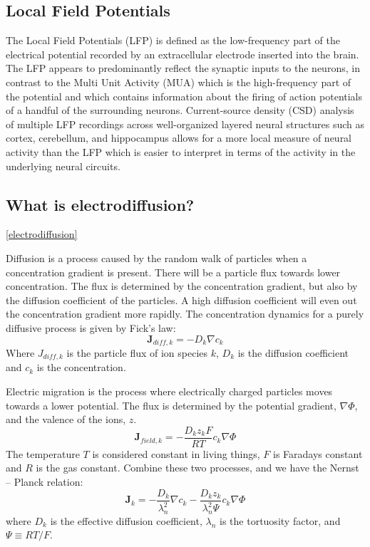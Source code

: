 \documentclass{article}
\begin{document}
\subsection{Local Field Potentials}
The Local Field Potentials (LFP) is defined as the low-frequency part of the electrical potential recorded by an extracellular electrode
inserted into the brain. The LFP appears to predominantly reflect the synaptic inputs to the neurons, in contrast to the Multi Unit Activity (MUA) which is the high-frequency part of the potential and  which contains information about the firing of action potentials of a handful of the
surrounding neurons.  Current-source density (CSD) analysis of multiple LFP recordings across well-organized
layered neural structures such as cortex, cerebellum, and hippocampus allows for a more local measure of neural activity than the LFP which is easier to interpret in terms of the activity in the underlying neural circuits.
\subsection{What is electrodiffusion?}\ref{electrodiffusion}

Diffusion is a process caused by the random walk of particles when a concentration gradient is present. There will be a particle flux towards lower concentration. The flux is determined by the concentration gradient, but also by the diffusion coefficient of the particles. A high diffusion coefficient will even out the concentration gradient more rapidly. The concentration dynamics for a purely diffusive process is given by Fick's law:
\begin{equation}\label{eq:diff}
 \bm{J}_{diff,k} = - D_k\nabla c_k
\end{equation}
Where  $J_{diff,k}$ is the particle flux of ion species $k$, $D_k$ is the diffusion coefficient and $c_k$ is the concentration.

Electric migration is the process where electrically charged particles moves towards a lower potential. The flux is determined by the potential gradient, $\nabla \Phi$,  and the valence of the ions, $z$. 
\begin{equation}
\bm{J}_{field,k} = -\frac{D_kz_kF}{RT} c_k\nabla \Phi
\end{equation}
The temperature $T$ is considered constant in living things, $F$ is Faradays constant and $R$ is the gas constant. Combine these two processes, and we have the Nernst -- Planck relation:
 \begin{equation}\label{eq:nernst-planck}
\bm{J}_k = -\frac{D_k}{\lambda_n^2}\nabla c_k -\frac{D_k z_k}{\lambda_n^2 \Psi}c_k  \nabla \Phi
\end{equation}
where $D_k$ is the effective diffusion coefficient, $\lambda_n$ is the tortuosity factor, and $\Psi \equiv RT/F$.
\end{document}
